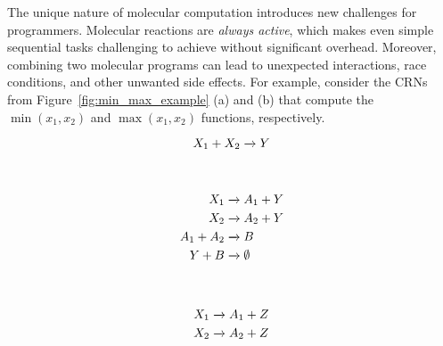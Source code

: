 The unique nature of molecular computation introduces new challenges for programmers.
Molecular reactions are \emph{always active}, which makes even simple sequential tasks challenging to achieve without significant overhead.
Moreover, combining two molecular programs can lead to unexpected interactions, race conditions, and other unwanted side effects.
For example, consider the CRNs from Figure~\ref{fig:min_max_example} (a) and (b) that compute the \( \min(x_1, x_2) \) and \( \max(x_1, x_2) \) functions, respectively.
\begin{figure*}[t!]
    \centering
    \begin{subfigure}[t]{0.23\textwidth}
        \centering
        \begin{minipage}[t][1.5in][b]{0.23\textwidth}
            \vspace*{\fill}
            \[
                X_1 + X_2 \xrightarrow{} Y
            \]
            \vspace*{\fill}
        \end{minipage}
        \vspace*{-1.5em}
        \caption{}
    \end{subfigure}
    ~
    \begin{subfigure}[t]{0.23\textwidth}
        \centering
        \begin{minipage}[t][1.5in][b]{0.23\textwidth}
            \vspace*{\fill}
            \begin{align*}
                X_1 &\xrightarrow{} A_1 + Y\\
                X_2 &\xrightarrow{} A_2 + Y\\
                A_1 + A_2 &\xrightarrow{} B\\
                Y + B &\xrightarrow{} \emptyset
            \end{align*}
            \vspace*{\fill}
        \end{minipage}
        \vspace*{-1.5em}
        \caption{}
    \end{subfigure}
    ~
    \begin{subfigure}[t]{0.23\textwidth}
        \centering
        \begin{minipage}[t][1.5in][b]{0.23\textwidth}
            \vspace*{\fill}
            \begin{align*}
                X_1 &\goesto{} A_1 + Z\\
                X_2 &\goesto{} A_2 + Z\\

\end{align*}
\end{minipage}
\end{subfigure}
\end{figure*}
